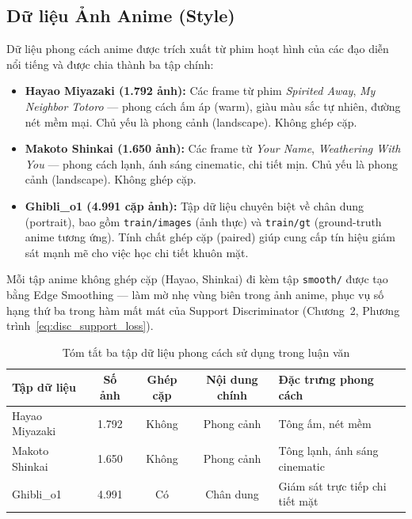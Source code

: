 \subsection{Dữ liệu Ảnh Anime (Style)}
\label{subsec:anime_data}

Dữ liệu phong cách anime được trích xuất từ phim hoạt hình của các đạo diễn nổi tiếng và được chia thành ba tập chính:
\begin{itemize}
    \item \textbf{Hayao Miyazaki (1.792 ảnh):} Các frame từ phim \textit{Spirited Away}, \textit{My Neighbor Totoro} --- phong cách ấm áp (warm), giàu màu sắc tự nhiên, đường nét mềm mại. Chủ yếu là phong cảnh (landscape). Không ghép cặp.
    \item \textbf{Makoto Shinkai (1.650 ảnh):} Các frame từ \textit{Your Name}, \textit{Weathering With You} --- phong cách lạnh, ánh sáng cinematic, chi tiết mịn. Chủ yếu là phong cảnh (landscape). Không ghép cặp.
    \item \textbf{Ghibli\_o1 (4.991 cặp ảnh):} Tập dữ liệu chuyên biệt về chân dung (portrait), bao gồm \texttt{train/images} (ảnh thực) và \texttt{train/gt} (ground-truth anime tương ứng). Tính chất ghép cặp (paired) giúp cung cấp tín hiệu giám sát mạnh mẽ cho việc học chi tiết khuôn mặt.
\end{itemize}

Mỗi tập anime không ghép cặp (Hayao, Shinkai) đi kèm tập \texttt{smooth/} được tạo bằng Edge Smoothing --- làm mờ nhẹ vùng biên trong ảnh anime, phục vụ số hạng thứ ba trong hàm mất mát của Support Discriminator (Chương~2, Phương trình~\ref{eq:disc_support_loss}).

\begin{table}[H]
\caption{Tóm tắt ba tập dữ liệu phong cách sử dụng trong luận văn}
\label{tab:dataset_summary}
\centering
\begin{tabular}{|l|c|c|c|p{4cm}|}
\hline
\textbf{Tập dữ liệu} & \textbf{Số ảnh} & \textbf{Ghép cặp} & \textbf{Nội dung chính} & \textbf{Đặc trưng phong cách} \\
\hline
Hayao Miyazaki & 1.792 & Không & Phong cảnh & Tông ấm, nét mềm \\
\hline
Makoto Shinkai & 1.650 & Không & Phong cảnh & Tông lạnh, ánh sáng cinematic \\
\hline
Ghibli\_o1 & 4.991 & Có & Chân dung & Giám sát trực tiếp chi tiết mặt \\
\hline
\end{tabular}
\end{table}

